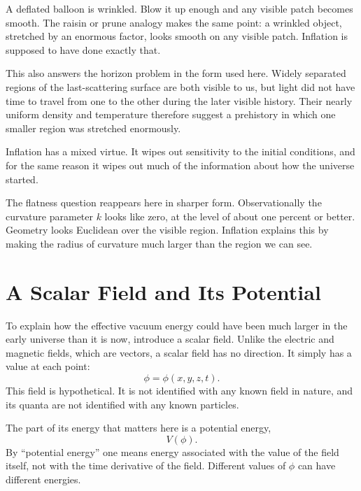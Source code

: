 A deflated balloon is wrinkled. Blow it up enough and any visible patch becomes smooth. The raisin or prune analogy makes the same point: a wrinkled object, stretched by an enormous factor, looks smooth on any visible patch. Inflation is supposed to have done exactly that.

This also answers the horizon problem in the form used here. Widely separated regions of the last-scattering surface are both visible to us, but light did not have time to travel from one to the other during the later visible history. Their nearly uniform density and temperature therefore suggest a prehistory in which one smaller region was stretched enormously.

Inflation has a mixed virtue. It wipes out sensitivity to the initial conditions, and for the same reason it wipes out much of the information about how the universe started.

The flatness question reappears here in sharper form. Observationally the curvature parameter \(k\) looks like zero, at the level of about one percent or better. Geometry looks Euclidean over the visible region. Inflation explains this by making the radius of curvature much larger than the region we can see.

\begin{classroomqa}
\end{classroomqa}

\section{A Scalar Field and Its Potential}

To explain how the effective vacuum energy could have been much larger in the early universe than it is now, introduce a scalar field. Unlike the electric and magnetic fields, which are vectors, a scalar field has no direction. It simply has a value at each point:
\begin{equation}
\phi=\phi(x,y,z,t).
\end{equation}
This field is hypothetical. It is not identified with any known field in nature, and its quanta are not identified with any known particles.

The part of its energy that matters here is a potential energy,
\begin{equation}
V(\phi).
\end{equation}
By ``potential energy'' one means energy associated with the value of the field itself, not with the time derivative of the field. Different values of \(\phi\) can have different energies.

